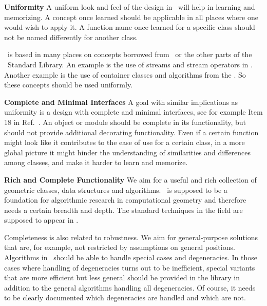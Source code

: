 {\bf Uniformity}
A uniform look and feel of the design in \cgal\ will help in learning
and memorizing. A concept once learned should be applicable in all
places where one would wish to apply it. 
A function name once learned for a specific
class should not be named differently for another class. 

\ccIndexMainItem{\stl}
\cgal\ is based in many places on concepts borrowed from \stl\ or the
other parts of the \CC\ Standard Library. An example is the use of
streams and stream operators in \cgal. Another example is the use of
container classes and algorithms from the \stl. So these concepts 
should be used uniformly.

{\bf Complete and Minimal Interfaces}
A goal with similar implications as uniformity is a design
with complete and minimal interfaces, see for example Item 18 
in Ref.~\cite{cgal:m-ec-97}.
An object or module should be complete in its 
functionality, but should
not provide additional decorating functionality. Even if a certain
function might look like it contributes to the ease of use for a certain 
class, in a more global picture it might hinder the understanding of 
similarities and differences among classes, and make it harder to learn 
and memorize.

{\bf Rich and Complete Functionality}
We aim for a useful and rich collection of geometric classes, data
structures and algorithms. \cgal\ is supposed to be a foundation for
algorithmic research in computational geometry and therefore needs a
certain breadth and depth. The standard techniques in the field are
supposed to appear in \cgal. 

Completeness is also related to robustness.
We aim for general-purpose
solutions that are, for example, not restricted by assumptions on
general positions. Algorithms in \cgal\ should be able to handle
special cases and degeneracies. 
In those cases where handling of degeneracies turns out to be
inefficient, special variants that are more efficient but less general
should be provided in the library in addition to the general 
algorithms handling all degeneracies. Of course, it needs to be
clearly documented which degeneracies are handled and which are not.

